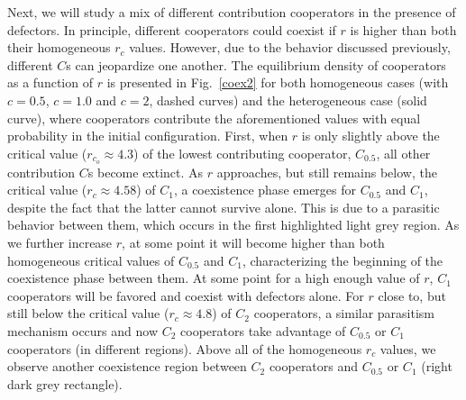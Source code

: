 \documentclass[twocolumn,aps,amsmath,pre,floatfix,superscriptaddress]{revtex4-2}
\begin{document}
Next, we will study a mix of different contribution cooperators in the presence of defectors.
%
In principle, different cooperators could coexist if $r$ is higher than both their homogeneous $r_c$ values. However, due to the behavior discussed previously, different $C$s can jeopardize one another.
%
The equilibrium density of cooperators as a function of $r$ is presented in Fig.~\ref{coex2} for both homogeneous cases (with $c=0.5$, $c=1.0$ and $c=2$, dashed curves) and the heterogeneous case (solid curve), where cooperators contribute the aforementioned values with equal probability in the initial configuration. 
%
First, when $r$ is only slightly above the critical value ($r_{c_o} \approx 4.3$) of the lowest contributing cooperator, $C_{0.5}$, all other contribution $C$s become extinct.
%
As $r$ approaches, but still remains below, the critical value ($r_c\approx 4.58 $) of $C_1$, a coexistence phase emerges for $C_{0.5}$ and $C_1$, despite the fact that the latter cannot survive alone. This is due to a parasitic behavior between them, which occurs in the first highlighted light grey region.
%
As we further increase $r$, at some point it will become higher than both homogeneous critical values of $C_{0.5}$ and $C_1$, characterizing the beginning of the coexistence phase between them. At some point for a high enough value of $r$, $C_1$ cooperators will be favored and coexist with defectors alone. 
%
 For $r$ close to, but still below the critical value ($r_c\approx 4.8$) of $C_2$ cooperators, a similar parasitism mechanism occurs and now $C_2$ cooperators take advantage of $C_{0.5}$ or $C_1$ cooperators (in different regions). 
%
Above all of the homogeneous $r_c$ values, we observe another coexistence region between $C_2$ cooperators and $C_{0.5}$ or $C_1$ (right dark grey rectangle). 
%
\end{document}
